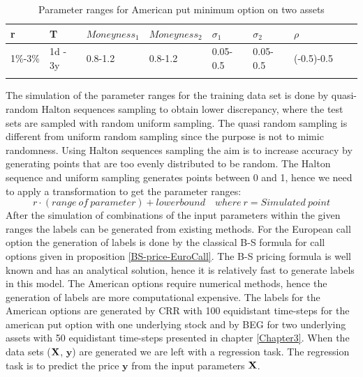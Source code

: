 \begin{table}[th]
\caption[Parameter Ranges For MLPs]{Parameter ranges for American put minimum option on two assets}
\label{tab:ExoticParRange}
\centering
\begin{tabular}{l l l l l l l l l}
\toprule
\textbf{r} & \textbf{T} & $Moneyness_1$ & $Moneyness_2$ & $\sigma_1$ & $\sigma_2$ & $\rho$ \\
\midrule
1\%-3\% & 1d - 3y & 0.8-1.2 & 0.8-1.2 & 0.05-0.5 & 0.05-0.5 & (-0.5)-0.5\\
\bottomrule\\
\end{tabular}
\end{table}

The simulation of the parameter ranges for the training data set is done by quasi-random Halton sequences sampling to obtain lower discrepancy, where the test sets are sampled with random uniform sampling. The quasi random sampling is different from uniform random sampling since the purpose is not to mimic randomness. Using Halton sequences sampling the aim is to increase accuracy by generating points that are too evenly distributed to be random. The Halton sequence and uniform sampling generates points between 0 and 1, hence we need to apply a transformation to get the parameter ranges:
$$r \cdot (range \ of \ parameter) + lower bound \quad where \ r=Simulated \ point$$
After the simulation of combinations of the input parameters within the given ranges the labels can be generated from existing methods. For the European call option the generation of labels is done by the classical B-S formula for call options given in proposition \ref{BS-price-EuroCall}. The B-S pricing formula is well known and has an analytical solution, hence it is relatively fast to generate labels in this model. The American options require numerical methods, hence the generation of labels are more computational expensive. The labels for the American options are generated by CRR with 100 equidistant time-steps for the american put option with one underlying stock and by BEG for two underlying assets with 50 equidistant time-steps presented in chapter \ref{Chapter3}. When the data sets ($\mathbf{X}$, $\bm{y}$) are generated we are left with a regression task. The regression task is to predict the price $\bm{y}$ from the input parameters $\mathbf{X}$.\\ 

